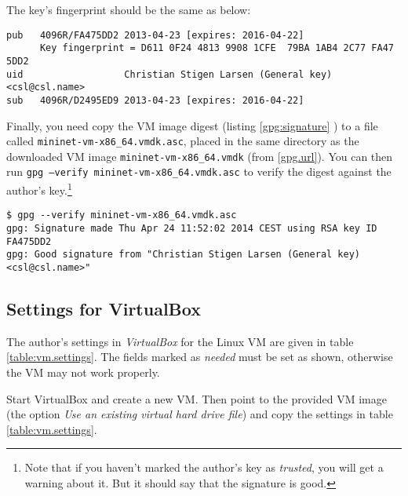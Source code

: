 The key's fingerprint should be the same as below:

\begin{lstlisting}[label={gpg:key.fingerprint}]
pub   4096R/FA475DD2 2013-04-23 [expires: 2016-04-22]
      Key fingerprint = D611 0F24 4813 9908 1CFE  79BA 1AB4 2C77 FA47 5DD2
uid                  Christian Stigen Larsen (General key) <csl@csl.name>
sub   4096R/D2495ED9 2013-04-23 [expires: 2016-04-22]
\end{lstlisting}

Finally, you need copy the VM image digest (listing \ref{gpg:signature}
) to a file called
\texttt{mininet-vm-x86\_{}64.vmdk.asc}, placed in the same directory as the
downloaded VM image \texttt{mininet-vm-x86\_{}64.vmdk} (from \vref{gpg.url}).
You can then run \texttt{gpg --verify mininet-vm-x86\_{}64.vmdk.asc} to verify
the digest against the author's key.\footnote{Note that if you haven't
marked the author's key as \textit{trusted}, you will get a warning about
it.  But it should say that the signature is good.}

\begin{lstlisting}[label={gpg:key.fingerprint}]
$ gpg --verify mininet-vm-x86_64.vmdk.asc
gpg: Signature made Thu Apr 24 11:52:02 2014 CEST using RSA key ID FA475DD2
gpg: Good signature from "Christian Stigen Larsen (General key) <csl@csl.name>"
\end{lstlisting}




\clearpage

\subsection{Settings for VirtualBox}

The author's settings in \textit{VirtualBox}
for the Linux VM are given in table
\vref{table:vm.settings}.  The fields marked as \textit{needed} must be set
as shown, otherwise the VM may not work properly.

Start VirtualBox and create a new VM.  Then point to the provided VM image
(the option \textit{Use an existing virtual hard drive file})
and copy the settings in table \vref{table:vm.settings}.

